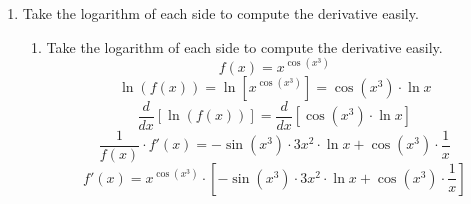 \documentclass[a4paper, 12pt]{article}
\begin{document}
\begin{enumerate}[leftmargin=*,label=\textbf{\arabic*.}]
\begin{enumerate}[leftmargin=*,label=\textbf{\alph*.}]
\item The inequality $\displaystyle-1 \leq \sin\left(\frac1x\right)\leq1$ holds for all $x\in\mathbb{R}$ except for $x=0$. For small $x$, we can multiply each side of the inequality by $\sqrt{x^2+2x^3}$. Using the squeeze theorem, the limit is equal to $0$.
\[-1\leq\sin\left(\frac1x\right)\leq1\implies -\sqrt{x^2+2x^3}\leq\sqrt{x^2+2x^3}\sin\left(\frac1x\right)\leq\sqrt{x^2+2x^3}\]
\[\lim_{x\to0}-\sqrt{x^2+2x^3}=\lim_{x\to0}\sqrt{x^2+2x^3}=0\implies\lim_{x\to0}\sqrt{x^2+2x^3}\sin\left(\frac1x\right)=\boxed0\]

\item Factor each side of the fraction and eliminate like terms.
\[\lim_{x\to3}\frac{x^2-9}{x^2-x-6}=\lim_{x\to3}\frac{(x-3)(x+3)}{(x-3)(x+2)}=\lim_{x\to3}\frac{x+3}{x+2}=\boxed{\frac65}\]

\item The expression is in the form $\infty-\infty$. Expand the expression by multiplying by its conjugate to eliminate the indetermination.
\begin{align*}
\lim_{x\to-\infty}\sqrt{x^2-4x}+x&=\lim_{x\to-\infty}\left[\left(\sqrt{x^2-4x} + x\right) \cdot\frac{\sqrt{x^2-4x}-x}{\sqrt{x^2-4x}-x}\right]\\[1em]&=\lim_{x\to-\infty}\frac{x^2-4x-x^2}{\sqrt{x^2-4x}-x}\\[1em]&=\lim_{x\to-\infty}\frac{-4x}{\sqrt{x^2-4x}-x}=\lim_{x\to-\infty}\frac{-4x}{\displaystyle |x|\sqrt{1-\frac4x}-x}\\[1em]&=\lim_{x\to-\infty}\frac{-4}{\displaystyle-\sqrt{1-\frac4x}-1}=\lim_{x\to-\infty}\frac42=\boxed{2}\end{align*}

\item Recall the definition of the derivative of a function at a point. Let $f$ be a differentiable function, then
\[\lim_{h\to 0} \frac{f(x+h)-f(x)}{h} = f'(x)\]

If we set $f(x) = x^{123}$, then we can differentiate $f$ at $x=1$.
\[\lim_{h\to0}\frac{(1+h)^{123}-1}{h}=f'(1)=123\cdot(1)^{122} = \boxed{123}\]
\end{enumerate}

\item Take the logarithm of each side to compute the derivative easily.
\begin{enumerate}[leftmargin=*,label=\textbf{\alph*.}]
\item Take the logarithm of each side to compute the derivative easily.
\[f(x)=x^{\cos\left(x^3\right)}\]
\[\ln(f(x))=\ln\left[x^{\cos\left(x^3\right)}\right]=\cos\left(x^3\right)\cdot\ln x\]
\[\frac{d}{dx}\left[\ln(f(x))\right] = \frac{d}{dx}\left[\cos\left(x^3\right)\cdot\ln x\right]\]
\[\frac{1}{f(x)}\cdot f'(x) = -\sin\left(x^3\right)\cdot 3x^2 \cdot \ln x + \cos\left(x^3\right)\cdot\frac1x\]
\[\boxed{f'(x) = x^{\cos\left(x^3\right)}\cdot\left[-\sin\left(x^3\right)\cdot 3x^2 \cdot \ln x + \cos\left(x^3\right)\cdot\frac1x\right]}\]


\end{enumerate}
\end{enumerate}
\end{document}
